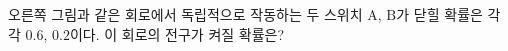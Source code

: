 \noindent\begin{minipage}[t]{0.58\linewidth}\vspace{0pt}\raggedright 오른쪽 그림과 같은 회로에서 독립적으로 작동하는 두 스위치 $\mathrm{A}$, $\mathrm{B}$가 닫힐 확률은 각각 $0.6$, $0.2$이다. 이 회로의 전구가 켜질 확률은?\end{minipage}\hfill\begin{minipage}[t]{0.4\linewidth}\vspace{0pt}\centering \resizebox{\ifdim\width>\linewidth\linewidth\else\width\fi}{!}{}\end{minipage}\par
{}
